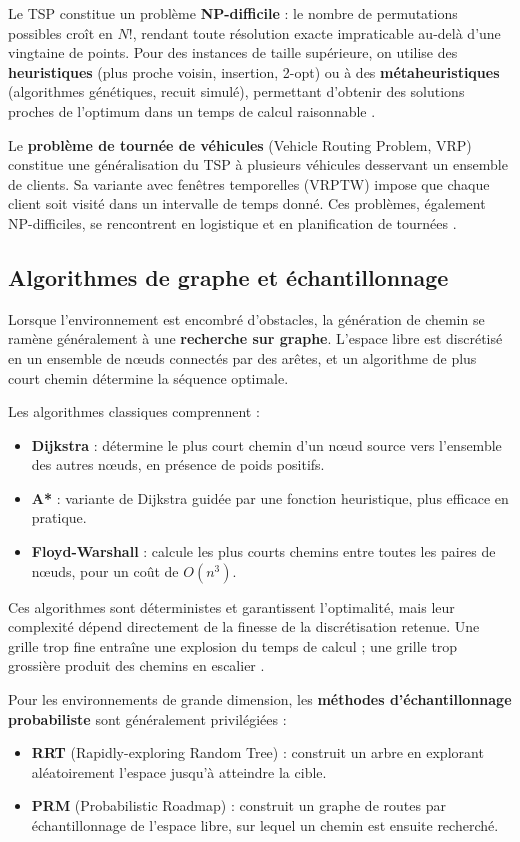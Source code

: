 Le TSP constitue un problème \textbf{NP-difficile} : le nombre de permutations possibles croît en $N!$, rendant toute résolution exacte impraticable au-delà d'une vingtaine de points. Pour des instances de taille supérieure, on utilise des \textbf{heuristiques} (plus proche voisin, insertion, 2-opt) ou à des \textbf{métaheuristiques} (algorithmes génétiques, recuit simulé), permettant d'obtenir des solutions proches de l'optimum dans un temps de calcul raisonnable \cite{gasparetto2015}.

Le \textbf{problème de tournée de véhicules} (Vehicle Routing Problem, VRP) constitue une généralisation du TSP à plusieurs véhicules desservant un ensemble de clients. Sa variante avec fenêtres temporelles (VRPTW) impose que chaque client soit visité dans un intervalle de temps donné. Ces problèmes, également NP-difficiles, se rencontrent en logistique et en planification de tournées \cite{gasparetto2015}.

\subsection{Algorithmes de graphe et échantillonnage}

Lorsque l'environnement est encombré d'obstacles, la génération de chemin se ramène généralement à une \textbf{recherche sur graphe}. L'espace libre est discrétisé en un ensemble de nœuds connectés par des arêtes, et un algorithme de plus court chemin détermine la séquence optimale.

Les algorithmes classiques comprennent :
\begin{itemize}
\item \textbf{Dijkstra} : détermine le plus court chemin d'un nœud source vers l'ensemble des autres nœuds, en présence de poids positifs.
\item \textbf{A*} : variante de Dijkstra guidée par une fonction heuristique, plus efficace en pratique.
\item \textbf{Floyd-Warshall} : calcule les plus courts chemins entre toutes les paires de nœuds, pour un coût de $O(n^3)$.
\end{itemize}

Ces algorithmes sont déterministes et garantissent l'optimalité, mais leur complexité dépend directement de la finesse de la discrétisation retenue. Une grille trop fine entraîne une explosion du temps de calcul ; une grille trop grossière produit des chemins en escalier \cite{gasparetto2015}.

Pour les environnements de grande dimension, les \textbf{méthodes d'échantillonnage probabiliste} sont généralement privilégiées :
\begin{itemize}
\item \textbf{RRT} (Rapidly-exploring Random Tree) : construit un arbre en explorant aléatoirement l'espace jusqu'à atteindre la cible.
\item \textbf{PRM} (Probabilistic Roadmap) : construit un graphe de routes par échantillonnage de l'espace libre, sur lequel un chemin est ensuite recherché.
\end{itemize}


